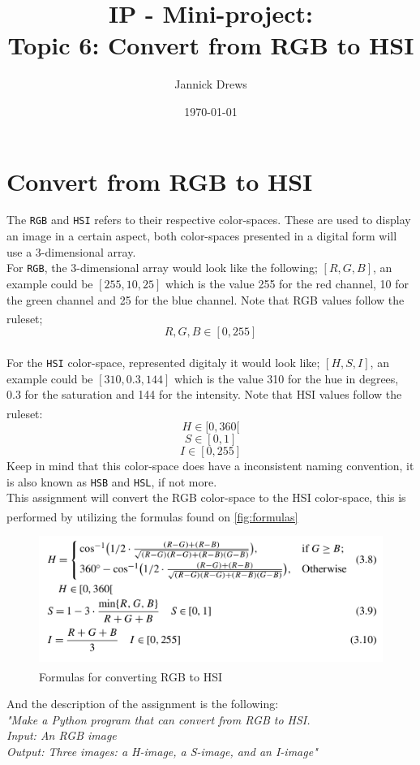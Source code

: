 \documentclass{article}
\title{IP - Mini-project:\\Topic 6: Convert from RGB to HSI}
\author{Jannick Drews}
\date{\today}
\newcommand{\goodcite}[1]{\textsuperscript{\cite{#1}}}
\begin{document}
\maketitle
\newpage
{}

\section{Convert from RGB to HSI}
The \texttt{RGB} and \texttt{HSI} refers to their respective color-spaces. These are used to display an image in a certain aspect, both color-spaces presented in a digital form will use a 3-dimensional array.\\
For \texttt{RGB}, the 3-dimensional array would look like the following; $[R, G, B]$, an example could be $[255, 10, 25]$ which is the value 255 for the red channel, 10 for the green channel and 25 for the blue channel. Note that RGB values follow the ruleset\goodcite{IP}; $$ R,G,B \in [0, 255] $$\\
For the \texttt{HSI} color-space, represented digitaly it would look like; $[H, S, I]$, an example could be $[310, 0.3, 144]$ which is the value 310 for the hue in degrees, 0.3 for the saturation and 144 for the intensity. Note that HSI values follow the ruleset\goodcite{IP}: $$ H \in [0, 360[ $$ $$ S \in [0, 1]$$ $$ I \in [0, 255]$$ Keep in mind that this color-space does have a inconsistent naming convention, it is also known as \texttt{HSB} and \texttt{HSL}, if not more.\medskip \\
This assignment will convert the RGB color-space to the HSI color-space, this is performed by utilizing the formulas found on \autoref{fig:formulas} \goodcite{IP}
\begin{figure}[H]
    \centering
    \includegraphics[width=\textwidth]{img/formula.png}
    \caption{Formulas for converting RGB to HSI\goodcite{IP}}
    \label{fig:formulas}
\end{figure}
And the description of the assignment is the following:\\
\textit{"Make a Python program that can convert from RGB to HSI.\\Input: An RGB image\\Output: Three images: a H-image, a S-image, and an I-image"}
\end{document}
